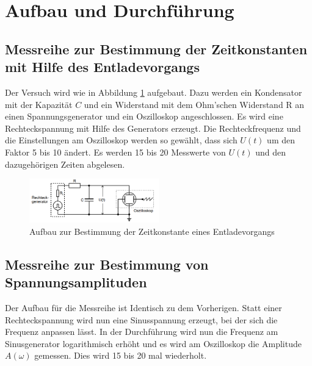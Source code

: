 \section{Aufbau und Durchführung}
\label{sec:Durchführung}
\subsection{Messreihe zur Bestimmung der Zeitkonstanten mit Hilfe des Entladevorgangs}
Der Versuch wird wie in Abbildung \ref{fig:aufbauent} aufgebaut. Dazu werden ein Kondensator mit der Kapazität $C$ und ein Widerstand mit dem
Ohm'schen Widerstand R an einen Spannungsgenerator und ein Oszilloskop angeschlossen. Es wird eine Rechteckspannung mit Hilfe des Generators erzeugt.
Die Rechteckfrequenz und die Einstellungen am Oszilloskop werden so gewählt, dass sich $U(t)$ um den Faktor 5 bis 10 ändert.
Es werden 15 bis 20 Messwerte von $U(t)$ und den dazugehörigen Zeiten abgelesen.
\begin{figure}
    \centering
    \caption{Aufbau zur Bestimmung der Zeitkonstante eines Entladevorgangs} 
    \label{fig:aufbauent}
    \includegraphics[width = 0.5\textwidth]{pics/aufbauent.png}
\end{figure}
\subsection{Messreihe zur Bestimmung von Spannungsamplituden}
Der Aufbau für die Messreihe ist Identisch zu dem Vorherigen. Statt einer Rechteckspannung wird nun eine Sinusspannung erzeugt, 
bei der sich die Frequenz anpassen lässt. In der Durchführung wird nun die Frequenz am Sinusgenerator logarithmisch erhöht und es wird am Oszilloskop die 
Amplitude $A(\omega)$ gemessen. Dies wird 15 bis 20 mal wiederholt.
